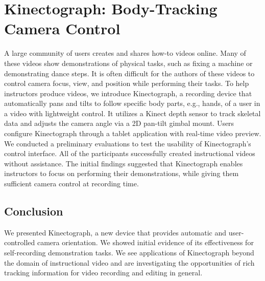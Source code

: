 \chapter{Kinectograph: Body-Tracking Camera Control}

A large community of users creates and shares how-to videos online. Many of these videos show demonstrations of physical tasks, such as fixing a machine or demonstrating dance steps. It is often difficult for the authors of these videos to control camera focus, view, and position while performing their tasks. To help instructors produce videos, we introduce Kinectograph, a recording device that automatically pans and tilts to follow specific body parts, e.g., hands, of a user in a video with lightweight control. It utilizes a Kinect depth sensor to track skeletal data and adjusts the camera angle via a 2D pan-tilt gimbal mount. Users configure Kinectograph through a tablet application with real-time video preview. We conducted a preliminary evaluations to test the usability of Kinectograph's control interface. All of the participants successfully created instructional videos without assistance. The initial findings suggested that Kinectograph enables instructors to focus on performing their demonstrations, while giving them sufficient camera control at recording time.











\section{Conclusion}
We presented Kinectograph, a new device that provides automatic and user-controlled camera orientation. We showed initial evidence of its effectiveness for self-recording demonstration tasks. We see applications of Kinectograph beyond the domain of instructional video and are investigating the opportunities of rich tracking information for video recording and editing in general.


